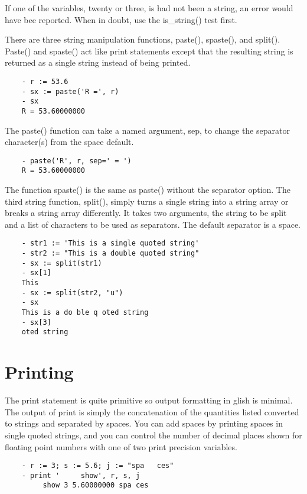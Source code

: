 If one of the variables, twenty or three, is had not been a string, an
error would have bee reported.  When in doubt, use the is\_string() test
first.

    There are three string manipulation functions, paste(), spaste(), and
split().  Paste() and spaste() act like print statements except that the
resulting string is returned as a single string instead of being printed.

\begin{verbatim}
	- r := 53.6
	- sx := paste('R =', r)
	- sx
	R = 53.60000000
\end{verbatim}

The paste() function can take a named argument, sep, to change the
separator character(s) from the space default.

\begin{verbatim}
	- paste('R', r, sep=' = ')
	R = 53.60000000
\end{verbatim}

The function spaste() is the same as paste() without the separator option.
The third string function, split(), simply turns a single string into a
string array or breaks a string array differently.  It takes two arguments,
the string to be split and a list of characters to be used as separators.
The default separator is a space.

\begin{verbatim}
	- str1 := 'This is a single quoted string'
	- str2 := "This is a double quoted string"
	- sx := split(str1)
	- sx[1]
	This
	- sx := split(str2, "u")
	- sx
	This is a do ble q oted string
	- sx[3]
	oted string
\end{verbatim}

\section{Printing}

    The print statement is quite primitive so output formatting in glish is
minimal.  The output of print is simply the concatenation of the quantities
listed converted to strings and separated by spaces.  You can add spaces by
printing spaces in single quoted strings, and you can control the number of
decimal places shown for floating point numbers with one of two print
precision variables.

\begin{verbatim}
	- r := 3; s := 5.6; j := "spa   ces"
	- print '     show', r, s, j
	     show 3 5.60000000 spa ces
\end{verbatim}

